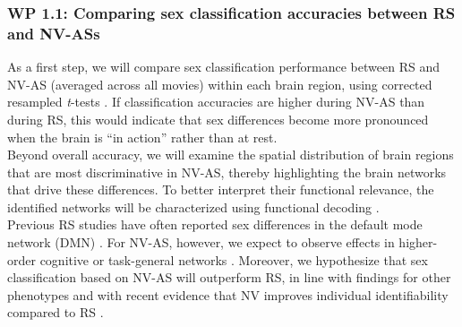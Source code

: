 \documentclass[11pt,a4paper]{article}
\begin{document}
\subsubsection*{WP 1.1:  Comparing sex classification accuracies between RS and NV-ASs}
As a first step, we will compare sex classification performance between RS and NV-AS (averaged across all movies) within each brain region, 
using corrected resampled \textit{t}-tests \parencite{nadeauInferenceGeneralizationError2003a}. 
If classification accuracies are higher during NV-AS than during RS, this would indicate that sex differences 
become more pronounced when the brain is “in action” rather than at rest.\\
Beyond overall accuracy, we will examine the spatial distribution of brain regions that are most discriminative in NV-AS, 
thereby highlighting the brain networks that drive these differences. To better interpret their functional relevance, 
the identified networks will be characterized using functional decoding \parencite{foxMetaanalysisHumanNeuroimaging2014a}.\\
Previous RS studies have often reported sex differences in the default mode network (DMN) 
\parencite{weisSexClassificationResting2020a,zhangFunctionalConnectivityPredicts2018}. 
For NV-AS, however, we expect to observe effects in higher-order cognitive or task-general networks 
\parencite{hugdahlExistenceGeneralizedNonspecific2015a}. Moreover, we hypothesize that sex classification based on 
NV-AS will outperform RS, in line with findings for other 
phenotypes \parencite{finnCanBrainState2017a,vanderwalIndividualDifferencesFunctional2017} and with recent 
evidence that NV improves individual identifiability compared to RS \parencite{krollNaturalisticViewingIncreases2023}.
\end{document}
